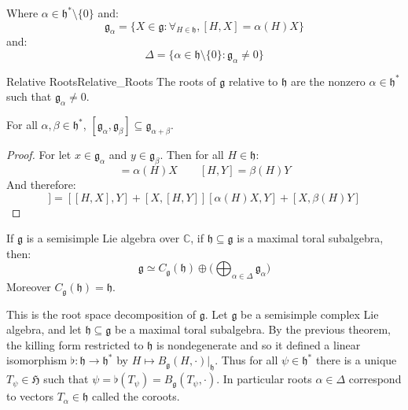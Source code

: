     Where $\alpha\in\mathfrak{h}^{*}\setminus\{0\}$ and:
    \begin{equation}
        \mathfrak{g}_{\alpha}
        =\{X\in\mathfrak{g}:\forall_{H\in\mathfrak{h}},[H,X]=\alpha(H)X\}
    \end{equation}
    and:
    \begin{equation}
        \Delta=\{\alpha\in\mathfrak{h}\setminus\{0\}:
            \mathfrak{g}_{\alpha}\ne{0}\}
    \end{equation}
    \begin{fdefinition}{Relative Roots}{Relative_Roots}
        The roots of $\mathfrak{g}$ relative to $\mathfrak{h}$ are the
        nonzero $\alpha\in\mathfrak{h}^{*}$ such that
        $\mathfrak{g}_{\alpha}\ne{0}$.
    \end{fdefinition}
    \begin{theorem}
        For all $\alpha,\beta\in\mathfrak{h}^{*}$,
        $[\mathfrak{g}_{\alpha},\mathfrak{g}_{\beta}]\subseteq
        \mathfrak{g}_{\alpha+\beta}$.
    \end{theorem}
    \begin{proof}
        For let $x\in\mathfrak{g}_{\alpha}$ and $y\in\mathfrak{g}_{\beta}$.
        Then for all $H\in\mathfrak{h}$:
        \begin{equation}
            [H,X]=\alpha(H)X
            \quad\quad
            [H,Y]=\beta(H)Y
        \end{equation}
        And therefore:
        \begin{equation}
            [H,[X,Y]]=
            [[H,X],Y]+[X,[H,Y]]
            [\alpha(H)X,Y]+[X,\beta(H)Y]
        \end{equation}
    \end{proof}
    \begin{theorem}
        If $\mathfrak{g}$ is a semisimple Lie algebra over $\mathbb{C}$, if
        $\mathfrak{h}\subseteq\mathfrak{g}$ is a maximal toral subalgebra,
        then:
        \begin{equation}
            \mathfrak{g}\simeq{C}_{\mathfrak{g}}(\mathfrak{h})\oplus
            \Big(\bigoplus_{\alpha\in\Delta}\mathfrak{g}_{\alpha}\Big)
        \end{equation}
        Moreover $C_{\mathfrak{g}}(\mathfrak{h})=\mathfrak{h}$.
    \end{theorem}
    This is the root space decomposition of $\mathfrak{g}$. Let
    $\mathfrak{g}$ be a semisimple complex Lie algebra, and let
    $\mathfrak{h}\subseteq\mathfrak{g}$ be a maximal toral subalgebra.
    By the previous theorem, the killing form restricted to
    $\mathfrak{h}$ is nondegenerate and so it defined a linear isomorphism
    $\flat:\mathfrak{h}\rightarrow\mathfrak{h}^{*}$ by
    $H\mapsto{B}_{\mathfrak{g}}(H,\cdot)|_{\mathfrak{h}}$. Thus for all
    $\psi\in\mathfrak{h}^{*}$ there is a unique $T_{\psi}\in\mathfrak{H}$
    such that $\psi=\flat(T_{\psi})=B_{\mathfrak{g}}(T_{\psi},\cdot)$.
    In particular roots $\alpha\in\Delta$ correspond to vectors
    $T_{\alpha}\in\mathfrak{h}$ called the coroots.
